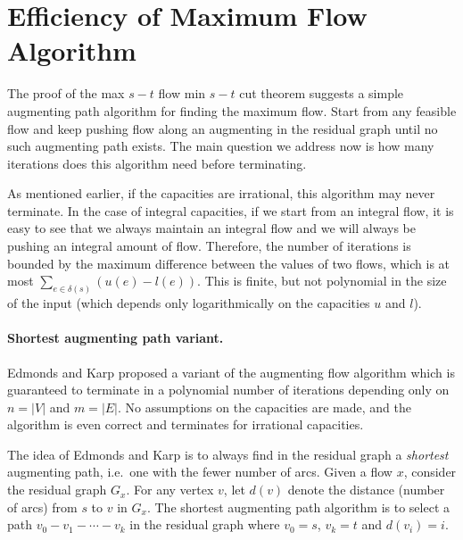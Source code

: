 \documentclass[12pt]{article}
\begin{document}
\section{Efficiency of Maximum Flow Algorithm}

The proof of the max $s-t$ flow min $s-t$ cut theorem suggests a
simple augmenting path algorithm for finding the maximum flow. Start
from any feasible flow and keep pushing flow along an augmenting in
the residual graph until no such augmenting path exists. The main
question we address now is how many iterations does this algorithm need
before terminating. 


As mentioned earlier, if the capacities are irrational, this algorithm
may never terminate. In the case of integral capacities, if we start
from an integral flow, it is easy to see that we always maintain an
integral flow and we will always be pushing an integral amount of
flow. Therefore, the number of iterations is bounded by the maximum
difference between the values of two flows, which is at most
$\sum_{e\in \delta(s)} (u(e)-l(e))$. This is finite, but not
polynomial in the size of the input (which depends only
logarithmically on the capacities $u$ and $l$).


\paragraph{Shortest augmenting path variant.} Edmonds and Karp
proposed a variant of the augmenting flow algorithm which is
guaranteed to terminate in a polynomial number of iterations depending
only on $n=|V|$ and $m=|E|$. No assumptions on the capacities are
made, and the algorithm is even correct and terminates for irrational
capacities. 

The idea of Edmonds and Karp is to always find in the residual graph
a {\it shortest} augmenting path, i.e.\ one with the fewer number of
arcs. Given a flow $x$, consider the residual graph $G_x$. For any
vertex $v$, let $d(v)$ denote the distance (number of arcs) from $s$
to $v$ in $G_x$. The shortest augmenting path algorithm is to select a
path $v_0-v_1-\cdots-v_k$ in the residual graph where $v_0=s$, $v_k=t$
and $d(v_i)=i$.
\end{document}
